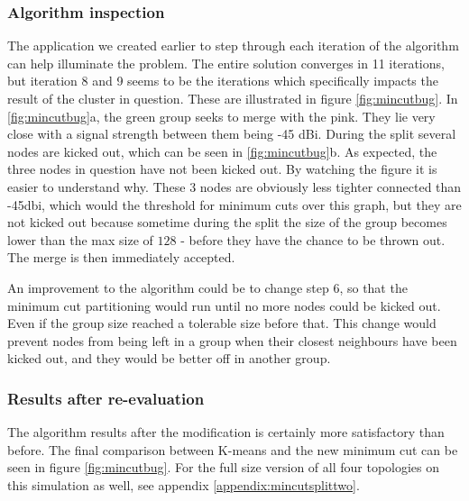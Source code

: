 \subsubsection{Algorithm inspection}
The application we created earlier to step through each iteration of the algorithm can help illuminate the problem. The entire solution converges in 11 iterations, but iteration 8 and 9 seems to be the iterations which specifically impacts the result of the cluster in question.
These are illustrated in figure \ref{fig:mincutbug}. In \ref{fig:mincutbug}a, the green group seeks to merge with the pink. They lie very close with a signal strength between them being -45 dBi.
During the split several nodes are kicked out, which can be seen in \ref{fig:mincutbug}b. As expected, the three nodes in question have not been kicked out. By watching the figure it is easier to understand why.
These 3 nodes are obviously less tighter connected than -45dbi, which would the threshold for minimum cuts over this graph, but they are not kicked out because sometime during the split the size of the group becomes lower than the max size of $128$ - before they have the chance to be thrown out. The merge is then immediately accepted. 

An improvement to the algorithm could be to change step 6, so that the minimum cut partitioning would run until no more nodes could be kicked out. Even if the group size reached a tolerable size before that. This change would prevent nodes from being left in a group when their closest neighbours have been kicked out, and they would be better off in another group.

\subsubsection{Results after re-evaluation}
The algorithm results after the modification is certainly more satisfactory than before. The final comparison between K-means and the new minimum cut can be seen in figure \ref{fig:mincutbug}. For the full size version of
all four topologies on this simulation as well, see appendix \ref{appendix:mincutsplittwo}. 

